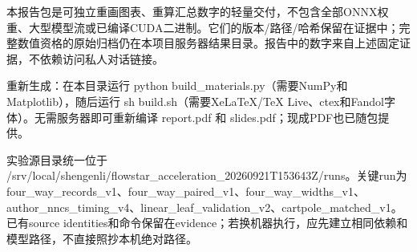 \documentclass[UTF8,fontset=fandol,11pt,a4paper]{ctexart}
\begin{document}
\normalsize
本报告包是可独立重画图表、重算汇总数字的轻量交付，不包含全部ONNX权重、大型模型流或已编译CUDA二进制。它们的版本/\allowbreak{}路径/\allowbreak{}哈希保留在证据中；完整数值资格的原始归档仍在本项目服务器结果目录。报告中的数字来自上述固定证据，不依赖访问私人对话链接。

重新生成：在本目录运行 python build\_\allowbreak{}materials.py（需要NumPy和Matplotlib），随后运行 sh build.sh（需要XeLaTeX/\allowbreak{}TeX Live、ctex和Fandol字体）。无需服务器即可重新编译 report.pdf 和 slides.pdf；现成PDF也已随包提供。

实验源目录统一位于 /\allowbreak{}srv/\allowbreak{}local/\allowbreak{}shengenli/\allowbreak{}flowstar\_\allowbreak{}acceleration\_\allowbreak{}20260921T153643Z/\allowbreak{}runs。关键run为 four\_\allowbreak{}way\_\allowbreak{}records\_\allowbreak{}v1、four\_\allowbreak{}way\_\allowbreak{}paired\_\allowbreak{}v1、four\_\allowbreak{}way\_\allowbreak{}widths\_\allowbreak{}v1、author\_\allowbreak{}nncs\_\allowbreak{}timing\_\allowbreak{}v4、linear\_\allowbreak{}leaf\_\allowbreak{}validation\_\allowbreak{}v2、cartpole\_\allowbreak{}matched\_\allowbreak{}v1。已有source identities和命令保留在evidence；若换机器执行，应先建立相同依赖和模型路径，不直接照抄本机绝对路径。
\end{document}
